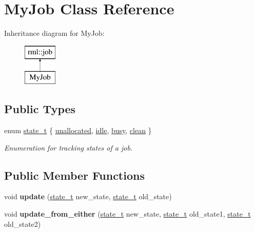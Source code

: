 \hypertarget{classMyJob}{}\section{My\+Job Class Reference}
\label{classMyJob}
Inheritance diagram for My\+Job\+:\begin{figure}[H]
\begin{center}
\leavevmode
\includegraphics[height=2.000000cm]{classMyJob}
\end{center}
\end{figure}
\subsection*{Public Types}
\begin{DoxyCompactItemize}
\item 
enum \hyperlink{classMyJob_a44f37d865cfb3f176ea9c11a1e8e8990}{state\+\_\+t} \{ \hyperlink{classMyJob_a44f37d865cfb3f176ea9c11a1e8e8990a4e2de3a378e6ee8c06a02526b0633b6e}{unallocated}, 
\hyperlink{classMyJob_a44f37d865cfb3f176ea9c11a1e8e8990a09d330bda86806a4a270dd6457de4f1c}{idle}, 
\hyperlink{classMyJob_a44f37d865cfb3f176ea9c11a1e8e8990aa0a3bdd0a6e7e629c60ec61e068d8c42}{busy}, 
\hyperlink{classMyJob_a44f37d865cfb3f176ea9c11a1e8e8990a46229049d574a49884331f09889dc6c7}{clean}
 \}\begin{DoxyCompactList}\small\item\em Enumeration for tracking states of a job. \end{DoxyCompactList}
\end{DoxyCompactItemize}
\subsection*{Public Member Functions}
\begin{DoxyCompactItemize}
\item 
\hypertarget{classMyJob_a52e30afbaa40d5a75a193261a4a84813}{}void {\bfseries update} (\hyperlink{classMyJob_a44f37d865cfb3f176ea9c11a1e8e8990}{state\+\_\+t} new\+\_\+state, \hyperlink{classMyJob_a44f37d865cfb3f176ea9c11a1e8e8990}{state\+\_\+t} old\+\_\+state)\label{classMyJob_a52e30afbaa40d5a75a193261a4a84813}

\item 
\hypertarget{classMyJob_a6e41db3dda2e8d3be04de7ad5efa975d}{}void {\bfseries update\+\_\+from\+\_\+either} (\hyperlink{classMyJob_a44f37d865cfb3f176ea9c11a1e8e8990}{state\+\_\+t} new\+\_\+state, \hyperlink{classMyJob_a44f37d865cfb3f176ea9c11a1e8e8990}{state\+\_\+t} old\+\_\+state1, \hyperlink{classMyJob_a44f37d865cfb3f176ea9c11a1e8e8990}{state\+\_\+t} old\+\_\+state2)\label{classMyJob_a6e41db3dda2e8d3be04de7ad5efa975d}

\end{DoxyCompactItemize}
